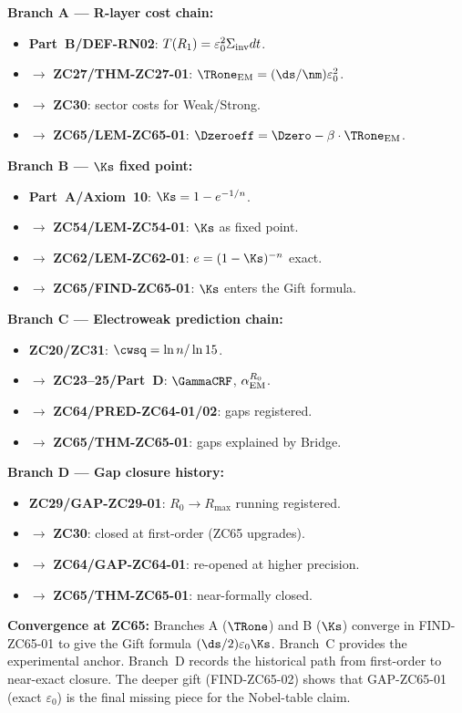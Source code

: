 \documentclass[12pt, a4paper]{article}
\renewcommand{\aEM}{\alpha_{\rm EM}}
\begin{document}
\begin{genealogybox}[title={How ZC65's Key Objects Trace Back}]

\textbf{Branch A --- R-layer cost chain:}
\begin{itemize}[leftmargin=2em, noitemsep]
  \item \textbf{Part~B/DEF-RN02}: $T(R_1) = \varepsilon_0^2\Sigma_{\rm inv}dt$.
  \item $\to$ \textbf{ZC27/THM-ZC27-01}: $\TRone_{\rm EM} = (\ds/\nm)\varepsilon_0^2$.
  \item $\to$ \textbf{ZC30}: sector costs for Weak/Strong.
  \item $\to$ \textbf{ZC65/LEM-ZC65-01}: $\Dzeroeff = \Dzero - \beta\cdot\TRone_{\rm EM}$.
\end{itemize}

\textbf{Branch B --- $\Ks$ fixed point:}
\begin{itemize}[leftmargin=2em, noitemsep]
  \item \textbf{Part~A/Axiom~10}: $\Ks = 1-e^{-1/n}$.
  \item $\to$ \textbf{ZC54/LEM-ZC54-01}: $\Ks$ as fixed point.
  \item $\to$ \textbf{ZC62/LEM-ZC62-01}: $e = (1-\Ks)^{-n}$ exact.
  \item $\to$ \textbf{ZC65/FIND-ZC65-01}: $\Ks$ enters the Gift formula.
\end{itemize}

\textbf{Branch C --- Electroweak prediction chain:}
\begin{itemize}[leftmargin=2em, noitemsep]
  \item \textbf{ZC20/ZC31}: $\cwsq = \ln n/\ln15$.
  \item $\to$ \textbf{ZC23--25/Part~D}: $\GammaCRF$, $\aEM^{R_0}$.
  \item $\to$ \textbf{ZC64/PRED-ZC64-01/02}: gaps registered.
  \item $\to$ \textbf{ZC65/THM-ZC65-01}: gaps explained by Bridge.
\end{itemize}

\textbf{Branch D --- Gap closure history:}
\begin{itemize}[leftmargin=2em, noitemsep]
  \item \textbf{ZC29/GAP-ZC29-01}: $R_0\to R_{\max}$ running registered.
  \item $\to$ \textbf{ZC30}: closed at first-order (ZC65 upgrades).
  \item $\to$ \textbf{ZC64/GAP-ZC64-01}: re-opened at higher precision.
  \item $\to$ \textbf{ZC65/THM-ZC65-01}: near-formally closed.
\end{itemize}

\textbf{Convergence at ZC65:}
Branches A ($\TRone$) and B ($\Ks$) converge in FIND-ZC65-01
to give the Gift formula $(\ds/2)\varepsilon_0\Ks$.
Branch~C provides the experimental anchor.
Branch~D records the historical path from first-order
to near-exact closure.
The deeper gift (FIND-ZC65-02) shows that GAP-ZC65-01
(exact $\varepsilon_0$) is the final missing piece
for the Nobel-table claim.
\end{genealogybox}
\end{document}
